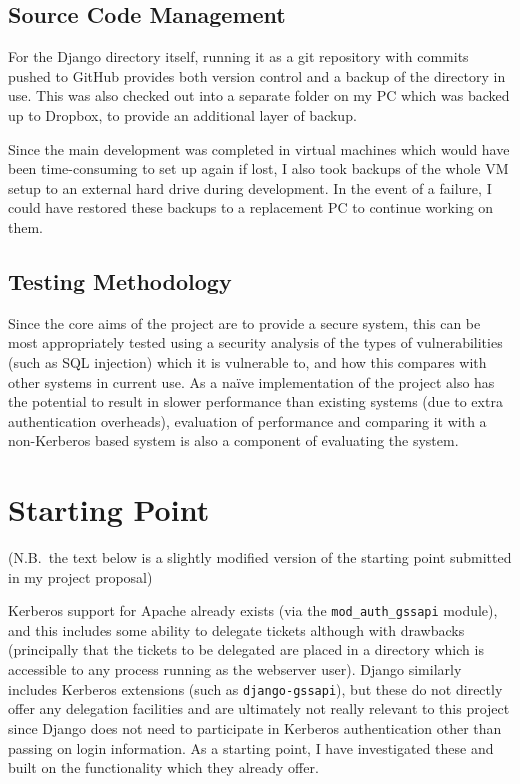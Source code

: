 \documentclass[12pt]{report}
\begin{document}
\subsection{Source Code Management}
For the Django directory itself, running it as a git repository with commits pushed to GitHub provides both version control and a backup of the directory in use. This was also checked out into a separate folder on my PC which was backed up to Dropbox, to provide an additional layer of backup.

Since the main development was completed in virtual machines which would have been time-consuming to set up again if lost, I also took backups of the whole VM setup to an external hard drive during development. In the event of a failure, I could have restored these backups to a replacement PC to continue working on them.

\subsection{Testing Methodology}
Since the core aims of the project are to provide a secure system, this can be most appropriately tested using a security analysis of the types of vulnerabilities (such as SQL injection) which it is vulnerable to, and how this compares with other systems in current use. As a na\"ive implementation of the project also has the potential to result in slower performance than existing systems (due to extra authentication overheads), evaluation of performance and comparing it with a non-Kerberos based system is also a component of evaluating the system.

\section{Starting Point}
(N.B.\ the text below is a slightly modified version of the starting point submitted in my project proposal)

Kerberos support for Apache already exists (via the \verb+mod_auth_gssapi+ module), and this includes some ability to delegate tickets although with drawbacks (principally that the tickets to be delegated are placed in a directory which is accessible to any process running as the webserver user). Django similarly includes Kerberos extensions (such as \verb+django-gssapi+), but these do not directly offer any delegation facilities and are ultimately not really relevant to this project since Django does not need to participate in Kerberos authentication other than passing on login information. As a starting point, I have investigated these and built on the functionality which they already offer.
\end{document}
